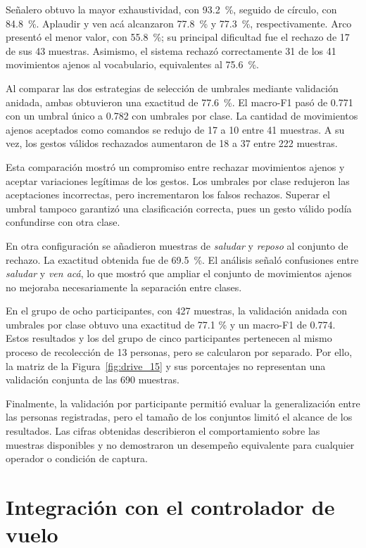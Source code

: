 Señalero obtuvo la mayor exhaustividad, con 93.2 \%, seguido de círculo, con 84.8 \%. Aplaudir y ven acá alcanzaron 77.8 \% y 77.3 \%, respectivamente. Arco presentó el menor valor, con 55.8 \%; su principal dificultad fue el rechazo de 17 de sus 43 muestras. Asimismo, el sistema rechazó correctamente 31 de los 41 movimientos ajenos al vocabulario, equivalentes al 75.6 \%.

Al comparar las dos estrategias de selección de umbrales mediante validación anidada, ambas obtuvieron una exactitud de 77.6 \%. El macro-F1 pasó de 0.771 con un umbral único a 0.782 con umbrales por clase. La cantidad de movimientos ajenos aceptados como comandos se redujo de 17 a 10 entre 41 muestras. A su vez, los gestos válidos rechazados aumentaron de 18 a 37 entre 222 muestras.

Esta comparación mostró un compromiso entre rechazar movimientos ajenos y aceptar variaciones legítimas de los gestos. Los umbrales por clase redujeron las aceptaciones incorrectas, pero incrementaron los falsos rechazos. Superar el umbral tampoco garantizó una clasificación correcta, pues un gesto válido podía confundirse con otra clase.

En otra configuración se añadieron muestras de \textit{saludar} y \textit{reposo} al conjunto de rechazo. La exactitud obtenida fue de 69.5 \%. El análisis señaló confusiones entre \textit{saludar} y \textit{ven acá}, lo que mostró que ampliar el conjunto de movimientos ajenos no mejoraba necesariamente la separación entre clases.

En el grupo de ocho participantes, con 427 muestras, la validación anidada con umbrales por clase obtuvo una exactitud de 77.1 \% y un macro-F1 de 0.774. Estos resultados y los del grupo de cinco participantes pertenecen al mismo proceso de recolección de 13 personas, pero se calcularon por separado. Por ello, la matriz de la Figura~\ref{fig:drive_15} y sus porcentajes no representan una validación conjunta de las 690 muestras.

Finalmente, la validación por participante permitió evaluar la generalización entre las personas registradas, pero el tamaño de los conjuntos limitó el alcance de los resultados. Las cifras obtenidas describieron el comportamiento sobre las muestras disponibles y no demostraron un desempeño equivalente para cualquier operador o condición de captura.

\section{Integración con el controlador de vuelo}

